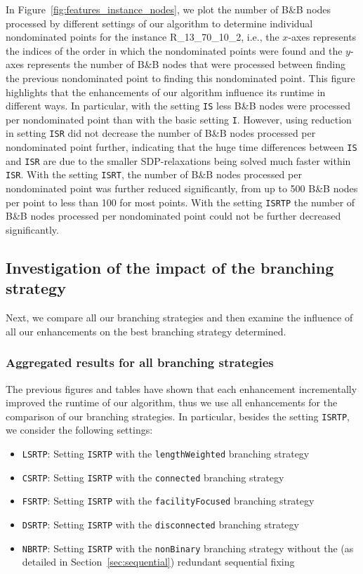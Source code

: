 \documentclass{article}
\newcommand{\BB}{B\&B\xspace}
\begin{document}
In Figure~\ref{fig:features_instance_nodes}, we plot the number of \BB nodes processed by different settings of our algorithm to determine individual nondominated points for the instance R\_13\_70\_10\_2, i.e., the $x$-axes represents the indices of the order in which the nondominated points were found and the $y$-axes represents the number of \BB nodes that were processed between finding the previous nondominated point to finding this nondominated point.
This figure highlights that the enhancements of our algorithm influence its runtime in different ways. In particular, with the setting \texttt{IS} less \BB nodes were processed per nondominated point than with the basic setting \texttt{I}. However, using reduction in setting \texttt{ISR} did not decrease the number of \BB nodes processed per nondominated point further, indicating that the huge time differences between \texttt{IS} and \texttt{ISR} are due to the smaller SDP-relaxations being solved much faster within \texttt{ISR}. With the setting \texttt{ISRT}, the number of \BB nodes processed per nondominated point was further reduced significantly, from up to 500 \BB nodes per point to less than 100 for most points. With the setting \texttt{ISRTP} the number of \BB nodes processed per nondominated point could not be further decreased significantly.

\subsection{Investigation of the impact of the branching strategy}\label{sec:branchResult}

Next, we compare all our branching strategies and then examine the influence of all our enhancements on the best branching strategy determined.

\subsubsection{Aggregated results for all branching strategies}\label{sec:branchAgg}

The previous figures and tables have shown that each enhancement incrementally improved the runtime of our algorithm, thus we use all enhancements for the comparison of our branching strategies. In particular, besides the setting \texttt{ISRTP}, we consider the following settings:
\begin{itemize}[noitemsep]
    \item \texttt{LSRTP}: Setting \texttt{ISRTP} with the \texttt{lengthWeighted} branching strategy 
    \item \texttt{CSRTP}: Setting \texttt{ISRTP} with the \texttt{connected} branching strategy
    \item \texttt{FSRTP}: Setting \texttt{ISRTP} with the \texttt{facilityFocused} branching strategy
    \item \texttt{DSRTP}: Setting \texttt{ISRTP} with the \texttt{disconnected} branching strategy
    \item \texttt{NBRTP}: Setting \texttt{ISRTP} with the \texttt{nonBinary} branching strategy without the (as detailed in Section~\ref{sec:sequential}) redundant sequential fixing
\end{itemize}
\end{document}
